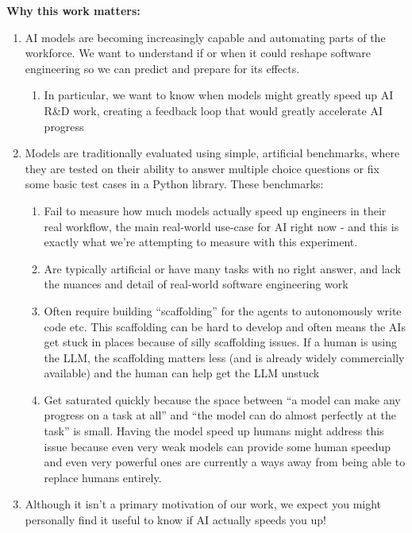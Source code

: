 \documentclass{article}
\begin{document}
\begin{instructionbox}
\textbf{Why this work matters:}
\begin{enumerate}
    \item AI models are becoming increasingly capable and automating parts of the workforce. We want to understand if or when it could reshape software engineering so we can predict and prepare for its effects.
    \begin{enumerate}
        \item In particular, we want to know when models might greatly speed up AI R\&D work, creating a feedback loop that would greatly accelerate AI progress
    \end{enumerate}
    \item Models are traditionally evaluated using simple, artificial benchmarks, where they are tested on their ability to answer multiple choice questions or fix some basic test cases in a Python library. These benchmarks:
    \begin{enumerate}
        \item Fail to measure how much models actually speed up engineers in their real workflow, the main real-world use-case for AI right now - and this is exactly what we’re attempting to measure with this experiment.
        \item Are typically artificial or have many tasks with no right answer, and lack the nuances and detail of real-world software engineering work
        \item Often require building “scaffolding” for the agents to autonomously write code etc. This scaffolding can be hard to develop and often means the AIs get stuck in places because of silly scaffolding issues. If a human is using the LLM, the scaffolding matters less (and is already widely commercially available) and the human can help get the LLM unstuck
        \item Get saturated quickly because the space between “a model can make any progress on a task at all” and “the model can do almost perfectly at the task” is small. Having the model speed up humans might address this issue because even very weak models can provide some human speedup and even very powerful ones are currently a ways away from being able to replace humans entirely.
    \end{enumerate}
    \item Although it isn’t a primary motivation of our work, we expect you might personally find it useful to know if AI actually speeds you up!
\end{enumerate}


\end{instructionbox}
\end{document}
